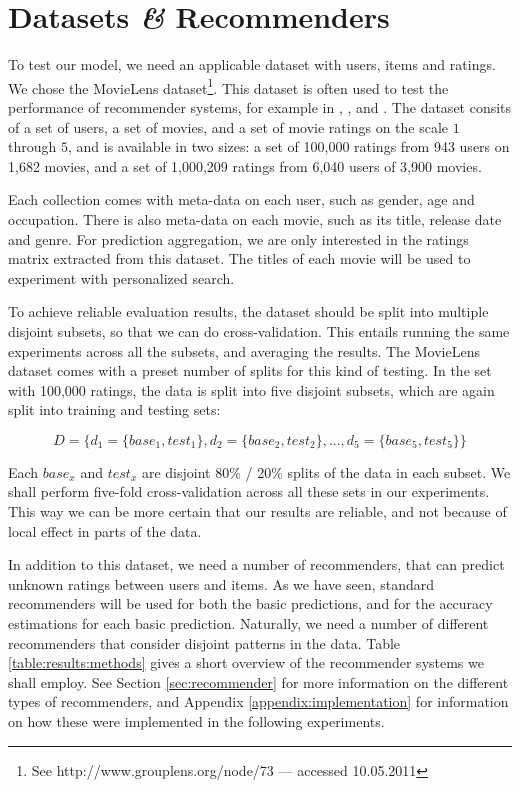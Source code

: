 \section{Datasets \emph{\&} Recommenders}

To test our model, we need an applicable dataset with users, items and ratings.
We chose the MovieLens dataset\footnote{
See http://www.grouplens.org/node/73 --- accessed 10.05.2011}.
This dataset is often used to test the performance of recommender systems,
for example in \citet[p9]{Alshamri2008}, \citet[p4]{Lemire2005}, \citet[p1]{Adomavicius2005}
and \citet[p2]{Herlocker2004}.
The dataset consits of a set of users, a set of movies, and a set of movie ratings
on the scale $1$ through $5$, and is available in two sizes:
a set of 100,000 ratings from 943 users on 1,682 movies,
and a set of 1,000,209 ratings from 6,040 users of 3,900 movies.

Each collection comes with meta-data on each user, such as
gender, age and occupation. There is also meta-data on each movie,
such as its title, release date and genre. 
For prediction aggregation, we are only interested in the ratings matrix
extracted from this dataset.
The titles of each movie will be used to experiment with personalized search.

To achieve reliable evaluation results, the dataset should be split into
multiple disjoint subsets, so that we can do cross-validation.
This entails running the same experiments across all the subsets,
and averaging the results.
The MovieLens dataset comes with a preset number of splits for this kind of testing.
In the set with 100,000 ratings, the data is split into five disjoint subsets,
which are again split into training and testing sets:

\begin{equation*}
  D = \{ d_1 = \{base_1, test_1\}, d_2 = \{base_2, test_2\}, ..., d_5 = \{base_5, test_5\} \}
\end{equation*}

Each $base_x$ and $test_x$ are disjoint 80\% / 20\% splits of the data in each subset.
We shall perform five-fold cross-validation across all these sets in our experiments.
This way we can be more certain that our results are reliable,
and not because of local effect in parts of the data.

In addition to this dataset, we need a number of recommenders,
that can predict unknown ratings between users and items.
As we have seen, standard recommenders will be used for both the basic predictions,
and for the accuracy estimations for each basic prediction.
Naturally, we need a number of different recommenders that consider
disjoint patterns in the data. Table \ref{table:results:methods}
gives a short overview of the recommender systems we shall employ.
See Section \ref{sec:recommender} for more information on the different
types of recommenders, and Appendix \ref{appendix:implementation}
for information on how these were implemented in the following experiments.


